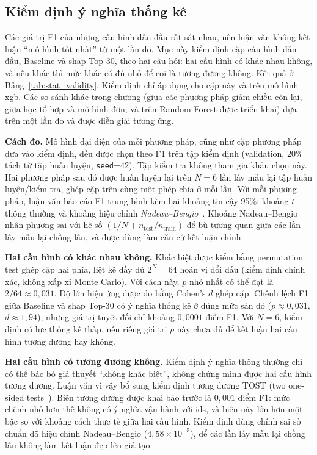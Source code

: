 \subsection{Kiểm định ý nghĩa thống kê}
\label{sec:stat_validity}
Các giá trị F1 của những cấu hình dẫn đầu rất sát nhau, nên luận văn không kết luận ``mô hình tốt nhất'' từ một lần đo. Mục này kiểm định cặp cấu hình dẫn đầu, Baseline và \ac{shap} Top-30, theo hai câu hỏi: hai cấu hình có khác nhau không, và nếu khác thì mức khác có đủ nhỏ để coi là tương đương không. Kết quả ở Bảng~\ref{tab:stat_validity}. Kiểm định chỉ áp dụng cho cặp này và trên mô hình \ac{xgb}. Các so sánh khác trong chương (giữa các phương pháp giảm chiều còn lại, giữa học tổ hợp và mô hình đơn, và trên Random Forest được triển khai) dựa trên một lần đo và được diễn giải tương ứng.

\textbf{Cách đo.} Mô hình đại diện của mỗi phương pháp, cũng như cặp phương pháp đưa vào kiểm định, đều được chọn theo F1 trên tập kiểm định (validation, 20\% tách từ tập huấn luyện, \texttt{seed}=42). Tập kiểm tra không tham gia khâu chọn này. Hai phương pháp sau đó được huấn luyện lại trên $N{=}6$ lần lấy mẫu lại tập huấn luyện/kiểm tra, ghép cặp trên cùng một phép chia ở mỗi lần. Với mỗi phương pháp, luận văn báo cáo F1 trung bình kèm hai khoảng tin cậy 95\%: khoảng $t$ thông thường và khoảng hiệu chỉnh \emph{Nadeau--Bengio}~\cite{nadeau2003inference}. Khoảng Nadeau--Bengio nhân phương sai với hệ số $(1/N + n_{\text{test}}/n_{\text{train}})$ để bù tương quan giữa các lần lấy mẫu lại chồng lấn, và được dùng làm căn cứ kết luận chính.

\textbf{Hai cấu hình có khác nhau không.} Khác biệt được kiểm bằng permutation test ghép cặp hai phía, liệt kê đầy đủ $2^N = 64$ hoán vị đổi dấu (kiểm định chính xác, không xấp xỉ Monte Carlo). Với cách này, $p$ nhỏ nhất có thể đạt là $2/64 \approx 0{,}031$. Độ lớn hiệu ứng được đo bằng Cohen's $d$ ghép cặp. Chênh lệch F1 giữa Baseline và \ac{shap} Top-30 có ý nghĩa thống kê ở đúng mức sàn đó ($p \approx 0{,}031$, $d \approx 1{,}94$), nhưng giá trị tuyệt đối chỉ khoảng $0{,}0001$ điểm F1. Với $N{=}6$, kiểm định có lực thống kê thấp, nên riêng giá trị $p$ này chưa đủ để kết luận hai cấu hình tương đương hay không.

\textbf{Hai cấu hình có tương đương không.} Kiểm định ý nghĩa thông thường chỉ có thể bác bỏ giả thuyết ``không khác biệt'', không chứng minh được hai cấu hình tương đương. Luận văn vì vậy bổ sung kiểm định tương đương TOST (two one-sided tests~\cite{schuirmann1987tost}). Biên tương đương được khai báo trước là $0{,}001$ điểm F1: mức chênh nhỏ hơn thế không có ý nghĩa vận hành với \ac{ids}, và biên này lớn hơn một bậc so với khoảng cách thực tế giữa hai cấu hình. Kiểm định dùng chính sai số chuẩn đã hiệu chỉnh Nadeau--Bengio ($4{,}58 \times 10^{-5}$), để các lần lấy mẫu lại chồng lấn không làm kết luận đẹp lên giả tạo.

